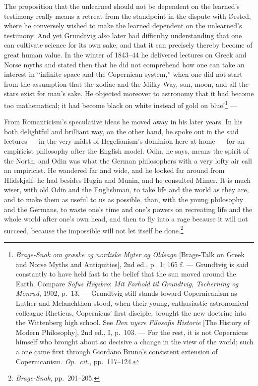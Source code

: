 \documentclass[12pt,a4paper]{book}
\newcommand{\opage}[1]{\marginnote{\footnotesize\textit{[#1]}}}
\begin{document}
The proposition that the unlearned should not be dependent on the learned's testimony
really means a retreat from the standpoint in the dispute with Ørsted, where he
conversely wished to make the learned dependent on the unlearned's testimony. And yet
Grundtvig also later had difficulty understanding that one can cultivate science for
its own sake, and that it can precisely thereby become of great human value. In the
winter of 1843--44 he delivered lectures on Greek and Norse myths and stated then that
he did not comprehend how one can take an interest in ``infinite space and the
Copernican system,'' when one did not start from the assumption that the zodiac and the
Milky Way, sun, moon, and all the stars exist for man's sake. He objected moreover to
astronomy that it had become too mathematical; it had become black on white instead of
gold on blue!\footnote{\emph{Brage-Snak om græske og nordiske Myter og Oldsagn}
[Brage-Talk on Greek and Norse Myths and Antiquities], 2nd ed., p.~1; 165 f. ---
Grundtvig is said constantly to have held fast to the belief that the sun moved around
the Earth. Compare \emph{Sofus Høgsbro}: \emph{Mit Forhold til Grundtvig, Tscherning og
Monrad}, 1902, p.~13. --- Grundtvig still stands toward Copernicanism as Luther and
Melanchthon stood, when their young, enthusiastic astronomical colleague Rheticus,
Copernicus' first disciple, brought the new doctrine into the Wittenberg high school.
See \emph{Den nyere Filosofis Historie} [The History of Modern Philosophy], 2nd ed., I,
p.~103. --- For the rest, it is not Copernicus himself who brought about so decisive a
change in the view of the world; such a one came first through Giordano Bruno's
consistent extension of Copernicanism. \emph{Op.\ cit.}, pp.~117--124.} ---

From Romanticism's speculative ideas he moved away in his later years. In his both
delightful and brilliant way, on the other hand, he spoke out in the said lectures ---
in the very midst of Hegelianism's dominion here at home --- for an empiricist
philosophy after the English model. Odin, he says, means the spirit of the North, and
\opage{65}Odin was what the German philosophers with a very lofty air call an empiricist. He
wandered far and wide, and he looked far around from Hlidskjalf; he had besides Hugin
and Munin, and he consulted Mimer. It is much wiser, with old Odin and the Englishman,
to take life and the world as they are, and to make them as useful to us as possible,
than, with the young philosophy and the Germans, to waste one's time and one's powers
on recreating life and the whole world after one's own head, and then to fly into a
rage because it will not succeed, because the impossible will not let itself be
done.\footnote{\emph{Brage-Snak}, pp.~201--205.}
\end{document}
